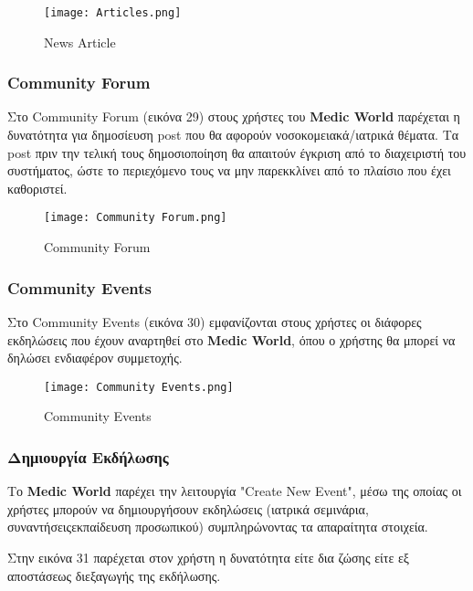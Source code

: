 \documentclass{article}
\begin{document}
\begin{figure}[!htb]
\centering
\texttt{[image: Articles.png]} 
\caption{\label{fig: news article} News Article}
\end{figure}

\subsubsection{Community Forum}

Στο Community Forum (εικόνα 29) στους χρήστες του \textbf{Medic World} παρέχεται η δυνατότητα για δημοσίευση post που θα αφορούν νοσοκομειακά/ιατρικά θέματα. Τα post πριν την τελική τους δημοσιοποίηση θα απαιτούν έγκριση από το διαχειριστή του συστήματος, ώστε το περιεχόμενο τους να μην παρεκκλίνει από το πλαίσιο που έχει καθοριστεί.

\vspace{0.3cm}

\begin{figure}[!htb]
\centering
\texttt{[image: Community Forum.png]} 
\caption{\label{fig: community forum} Community Forum}
\end{figure}

\newpage

\subsubsection{Community Events}

Στο Community Events (εικόνα 30) εμφανίζονται στους χρήστες οι διάφορες εκδηλώσεις που έχουν αναρτηθεί στο \textbf{Medic World}, όπου ο χρήστης θα μπορεί να δηλώσει ενδιαφέρον συμμετοχής.

\begin{figure}[!htb]
\centering
\texttt{[image: Community Events.png]} 
\caption{\label{fig: community events} Community Events}
\end{figure}

\subsubsection{Δημιουργία Εκδήλωσης}

Το \textbf{Medic World} παρέχει την λειτουργία "Create New Event", μέσω της οποίας οι χρήστες μπορούν να δημιουργήσουν εκδηλώσεις (ιατρικά σεμινάρια, συναντήσειςεκπαίδευση προσωπικού) συμπληρώνοντας τα απαραίτητα στοιχεία.
\par Στην εικόνα 31 παρέχεται στον χρήστη η δυνατότητα είτε δια ζώσης είτε εξ αποστάσεως διεξαγωγής της εκδήλωσης.
\end{document}
